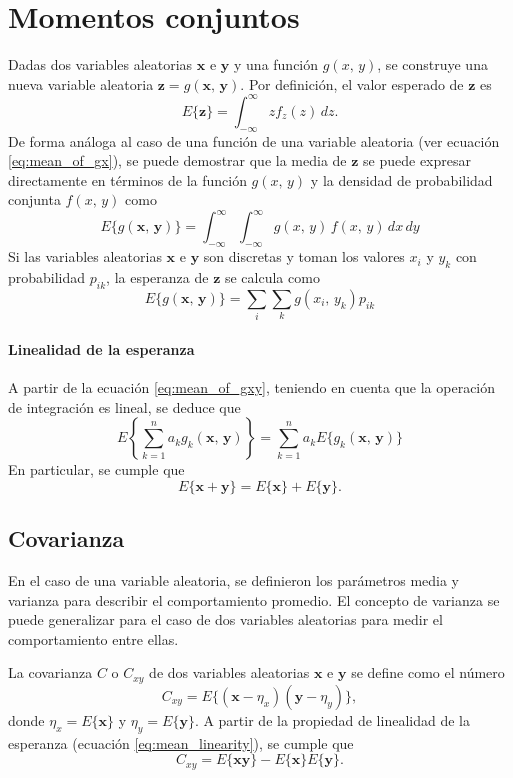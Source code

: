 \documentclass[a4paper]{report}
\newcommand{\x}{\mathbf{x}}
\newcommand{\y}{\mathbf{y}}
\newcommand{\z}{\mathbf{z}}
\begin{document}
\section{Momentos conjuntos}

Dadas dos variables aleatorias \(\x\) e \(\y\) y una función \(g(x,\,y)\), se construye una nueva variable aleatoria \(\z=g(\x,\,\y)\). Por definición, el valor esperado de \(\z\) es
\[
 E\{\z\}=\int_{-\infty}^{\infty}zf_z(z)\,dz.
\]
De forma análoga al caso de una función de una variable aleatoria (ver ecuación \ref{eq:mean_of_gx}), se puede demostrar que la media de \(\z\) se puede expresar directamente en términos de la función \(g(x,\,y)\) y la densidad de probabilidad conjunta \(f(x,\,y)\) como
\begin{equation}\label{eq:mean_of_gxy}
 E\{g(\x,\,\y)\}=\int_{-\infty}^{\infty}\int_{-\infty}^{\infty}g(x,\,y)\,f(x,\,y)\,dx\,dy
\end{equation}
Si las variables aleatorias \(\x\) e \(\y\) son discretas y toman los valores \(x_i\) y \(y_k\) con probabilidad \(p_{ik}\), la esperanza de \(\z\) se calcula como
\[
 E\{g(\x,\,\y)\}=\sum_{i}\sum_{k}g(x_i,\,y_k)p_{ik}
\]

\paragraph{Linealidad de la esperanza}

A partir de la ecuación \ref{eq:mean_of_gxy}, teniendo en cuenta que la operación de integración es lineal, se deduce que
\begin{equation}\label{eq:mean_linearity}
 E\left\{\sum_{k=1}^{n}a_kg_k(\x,\,\y)\right\}=\sum_{k=1}^{n}a_kE\{g_k(\x,\,\y)\}
\end{equation}
En particular, se cumple que
\[
 E\{\x+\y\}=E\{\x\}+E\{\y\}.
\]

\subsection{Covarianza}

En el caso de una variable aleatoria, se definieron los parámetros media y varianza para describir el comportamiento promedio. El concepto de varianza se puede generalizar para el caso de dos variables aleatorias para medir el comportamiento entre ellas.

La covarianza \(C\) o \(C_{xy}\) de dos variables aleatorias \(\x\) e \(\y\) se define como el número
\begin{equation}\label{eq:covariance_definition}
 C_{xy}=E\{(\x-\eta_x)(\y-\eta_y)\},
\end{equation}
donde \(\eta_x=E\{\x\}\) y \(\eta_y=E\{\y\}\). A partir de la propiedad de linealidad de la esperanza (ecuación \ref{eq:mean_linearity}), se cumple que
\[
 C_{xy}=E\{\x\y\}-E\{\x\}E\{\y\}.
\]
\end{document}
